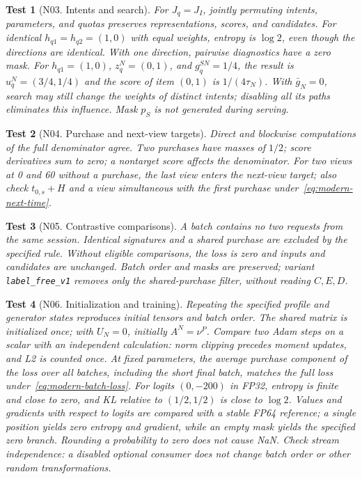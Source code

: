 \documentclass[12pt,a4paper]{article}
\newcommand{\code}[1]{{\ttfamily\small\nolinkurl{#1}}}
\theoremstyle{plainru}
\newtheorem{testcase}{Test}[section]
\begin{document}
\begin{testcase}[N03. Intents and search]
For $J_q=J_I$, jointly permuting intents, parameters, and quotas
preserves representations, scores, and candidates.
For identical $h_{q1}=h_{q2}=(1,0)$ with equal weights, entropy is
$\log2$, even though the directions are identical. With one direction,
pairwise diagnostics have a zero mask.
For $h_{q1}=(1,0)$, $z_q^N=(0,1)$, and $g_q^{SN}=1/4$,
the result is $u_q^N=(3/4,1/4)$ and the score of item $(0,1)$ is $1/(4\tau_N)$.
With $\bar g_N=0$, search may still change the weights of distinct intents;
disabling all its paths eliminates this influence. Mask $p_S$
is not generated during serving.
\end{testcase}

\begin{testcase}[N04. Purchase and next-view targets]
Direct and blockwise computations of the full denominator agree.
Two purchases have masses of $1/2$; score derivatives sum to zero;
a nontarget score affects the denominator.
For two views at 0 and 60 without a purchase, the last view
enters the next-view target; also check $t_{0,s}+H$ and a view
simultaneous with the first purchase under~\eqref{eq:modern-next-time}.
\end{testcase}

\begin{testcase}[N05. Contrastive comparisons]
A batch contains no two requests from the same session. Identical signatures
and a shared purchase are excluded by the specified rule.
Without eligible comparisons, the loss is zero and inputs and candidates are unchanged.
Batch order and masks are preserved; variant \code{label_free_v1}
removes only the shared-purchase filter, without reading $C,E,D$.
\end{testcase}

\begin{testcase}[N06. Initialization and training]
Repeating the specified profile and generator states reproduces
initial tensors and batch order. The shared matrix is initialized
once; with $U_N=0$, initially $A^N=\nu^P$.
Compare two Adam steps on a scalar with an independent calculation:
norm clipping precedes moment updates, and L2 is counted once.
At fixed parameters, the average purchase component of the loss
over all batches, including the short final batch, matches the full
loss under~\eqref{eq:modern-batch-loss}.
For logits $(0,-200)$ in FP32, entropy is finite and close to zero,
and KL relative to $(1/2,1/2)$ is close to $\log2$. Values and gradients with respect to logits
are compared with a stable FP64 reference; a single position yields zero
entropy and gradient, while an empty mask yields the specified zero branch.
Rounding a probability to zero does not cause NaN.
Check stream independence: a disabled optional consumer
does not change batch order or other random transformations.
\end{testcase}
\end{document}
